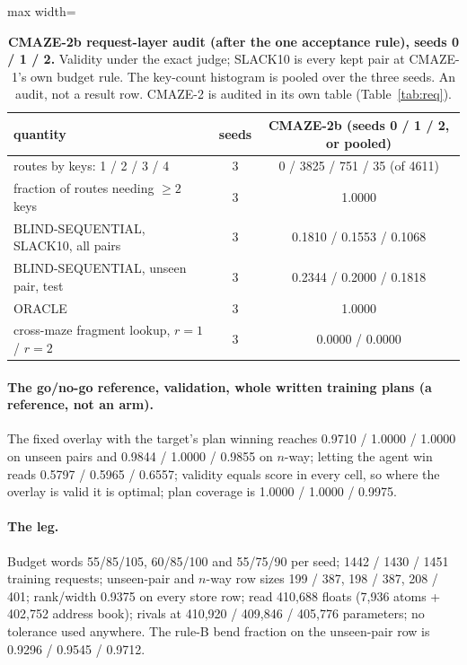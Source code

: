 \documentclass{article} %
\begin{document}
\begin{table}[h]
\centering\small
\caption{\textbf{CMAZE-2b request-layer audit (after the one acceptance rule), seeds 0 / 1 / 2.} %
Validity under the exact judge; SLACK10 is every kept pair at CMAZE-1's own budget rule. The
key-count histogram is pooled over the three seeds. An audit, not a result row. CMAZE-2 is
audited in its own table (Table~\ref{tab:req}).}
\label{tab:req2b}
\setlength{\tabcolsep}{3pt}
\begin{adjustbox}{max width=\linewidth}\begin{tabular}{lcc}
\toprule
quantity & seeds & CMAZE-2b (seeds 0 / 1 / 2, or pooled) \\
\midrule
routes by keys: 1 / 2 / 3 / 4 & 3 & 0 / 3825 / 751 / 35 (of 4611) \\
fraction of routes needing $\ge2$ keys & 3 & 1.0000 \\
BLIND-SEQUENTIAL, SLACK10, all pairs & 3 & 0.1810 / 0.1553 / 0.1068 \\
BLIND-SEQUENTIAL, unseen pair, test & 3 & 0.2344 / 0.2000 / 0.1818 \\
ORACLE & 3 & 1.0000 \\
cross-maze fragment lookup, $r=1$ / $r=2$ & 3 & 0.0000 / 0.0000 \\
\bottomrule
\end{tabular}\end{adjustbox}
\end{table}



\paragraph{The go/no-go reference, validation, whole written training plans (a reference, not an
arm).} The fixed overlay with the target's plan winning reaches 0.9710 / 1.0000 / 1.0000 on unseen
pairs and 0.9844 / 1.0000 / 0.9855 on $n$-way; letting the agent win reads 0.5797 / 0.5965 / 0.6557;
validity equals score in every cell, so where the overlay is valid it is optimal; plan coverage is
1.0000 / 1.0000 / 0.9975. %

\paragraph{The leg.} Budget words 55/85/105, 60/85/100 and 55/75/90 per seed; 1442 / 1430 / 1451
training requests; unseen-pair and $n$-way row sizes 199 / 387, 198 / 387, 208 / 401; rank/width
0.9375 on every store row; read 410,688 floats (7,936 atoms + 402,752 address book); rivals at
410,920 / 409,846 / 405,776 parameters; no tolerance used anywhere. The rule-B bend fraction on the
unseen-pair row is 0.9296 / 0.9545 / 0.9712. %
\end{document}
